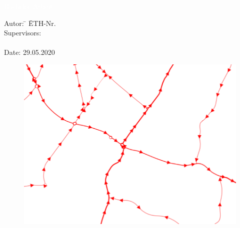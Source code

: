 %
%
%
%


\begin{titlepage}


{
\vspace{5mm}
{\Huge\textcolor{white}{Bachelor Arbeit}}\\[4mm]
{\Huge\textcolor{white}{\textbf{\mytitle}}}

{\color{white} 
\begin{tabbing}
Autor: \hspace{20mm} \= \myauthor \hspace{20mm} \= ETH-Nr. \myethnr \\[3mm]
Supervisors: \> \myprofessor\\[1mm]
\> \mysupervisor\\[3mm]
Date: 29.05.2020
\end{tabbing}
}
}
\vspace{20mm}

\begin{figure}[h!]
	\centering
	\includegraphics[width=\textwidth]{figures/01-02-Titelbild-GIS}
\end{figure}





\end{titlepage}


%

